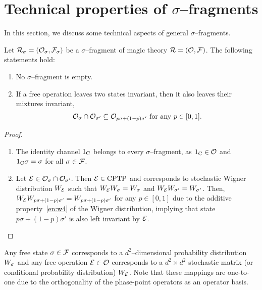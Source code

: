 
\section{Technical properties of $\sigma$--fragments}
\label{app:frag}

In this section, we discuss some technical aspects of general $\sigma$--fragments.

\begin{proposition}\label{thm:frag_app}
    Let ${\mathcal R}_\sigma = ({\mathcal O}_\sigma, {\mathcal F}_\sigma)$ be a $\sigma$--fragment of magic theory ${\mathcal R} = ({\mathcal O}, {\mathcal F})$. 
    The following statements hold:
    \begin{enumerate}
        \item No $\sigma$--fragment is empty.
        \item If a free operation leaves two states invariant, then it also leaves their mixtures invariant, 
        \begin{equation*}
            {\mathcal O}_{\sigma} \cap {\mathcal O}_{\sigma'} \subseteq {\mathcal O}_{p\sigma + (1-p)\sigma'}\ \text{for any}\ p \in [0,1].
        \end{equation*}
    \end{enumerate}
\end{proposition}
\begin{proof}$ $\vspace{-12pt}\\

\begin{enumerate}
    \item The identity channel $1_{\rm{C}}$ belongs to every $\sigma$--fragment, as $1_{\rm{C}} \in {\mathcal O}$ and $1_{\rm{C}}\sigma = \sigma$ for all $\sigma \in {\mathcal F}$.
    
    \item Let ${\mathcal E} \in {\mathcal O}_{\sigma} \cap {\mathcal O}_{\sigma'}$.
    Then ${\mathcal E} \in {\rm{CPTP}}$ and corresponds to stochastic Wigner distribution $\W{\E}$ such that $\W{\E} \W{\sigma} = \W{\sigma}$ and $\W{\E} \W{\sigma'} = \W{\sigma'}$.
    Then, $\W{\E} \W{p\sigma + (1-p)\sigma'} = \W{p\sigma + (1-p)\sigma'}$ for any $p \in [0,1]$ due to the additive property~\ref{en:w4} of the Wigner distribution, implying that state $p\sigma + (1-p)\sigma'$ is also left invariant by ${\mathcal E}$.
\end{enumerate}
\vspace{-20pt}
\end{proof}

Any free state $\sigma \in {\mathcal F}$ corresponds to a $d^2$--dimensional probability distribution $\W{\sigma}$ and any free operation ${\mathcal E} \in {\mathcal O}$ corresponds to a $d^2 \times d^2$ stochastic matrix (or conditional probability distribution) $\W{\E}$.
Note that these mappings are one-to-one due to the orthogonality of the phase-point operators as an operator basis.

